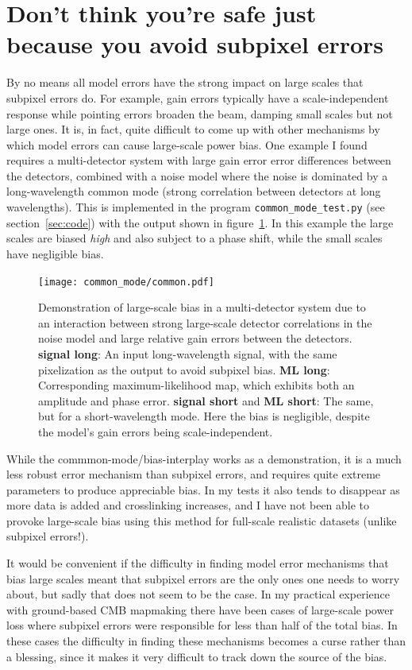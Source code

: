 \documentclass[twocolumn,apj]{aastex63}
\newcommand{\dfn}[1]{\textbf{#1}}
\begin{document}
\section{Don't think you're safe just because you avoid subpixel errors}
By no means all model errors have the strong impact on large scales
that subpixel errors do. For example, gain errors typically have a
scale-independent response while pointing errors broaden the beam, damping
small scales but not large ones. It is, in fact, quite difficult to come up
with other mechanisms by which model errors can cause large-scale power
bias. One example I found requires a multi-detector system with large
gain error error differences between the detectors, combined with a noise model where the noise is
dominated by a long-wavelength common mode (strong correlation between detectors
at long wavelengths). This is implemented in the program \verb|common_mode_test.py|
(see section~\ref{sec:code})
with the output shown in figure~\ref{fig:common}. In this example the
large scales are biased \emph{high} and also subject to a phase shift, while
the small scales have negligible bias.

\begin{figure}
	\centering
	\texttt{[image: common\_mode/common.pdf]}
	\caption{
		Demonstration of large-scale bias in a multi-detector system
		due to an interaction between strong large-scale
		detector correlations in the noise model and large
		relative gain errors between the detectors.
		\dfn{signal long}: An input long-wavelength signal,
		with the same pixelization as the output to avoid subpixel bias.
		\dfn{ML long}: Corresponding maximum-likelihood map, which
		exhibits both an amplitude and phase error.
		\dfn{signal short} and \dfn{ML short}: The same, but for a
		short-wavelength mode. Here the bias is negligible,
		despite the model's gain errors being scale-independent.
	}
	\label{fig:common}
\end{figure}

While the commmon-mode/bias-interplay works as a demonstration, it is a much
less robust error mechanism than subpixel errors, and requires quite extreme
parameters to produce appreciable bias. In my tests it also tends to disappear
as more data is added and crosslinking increases, and I have not been able to
provoke large-scale bias using this method for full-scale realistic datasets
(unlike subpixel errors!).

It would be convenient if the difficulty in finding model error mechanisms that
bias large scales meant that subpixel errors are the only ones one needs to
worry about, but sadly that does not seem to be the case. In my practical
experience with ground-based CMB mapmaking there have been cases of large-scale
power loss where subpixel errors were responsible for less than half of the
total bias. In these cases the difficulty in finding these mechanisms becomes
a curse rather than a blessing, since it makes it very difficult to track down
the source of the bias.
\end{document}
